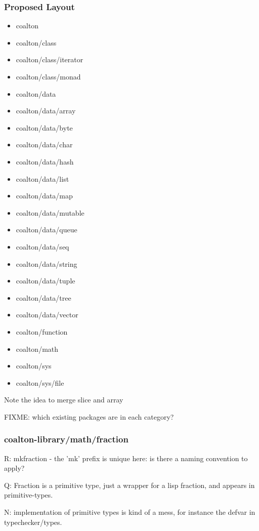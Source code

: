 \documentclass[12pt]{article}
\begin{document}
\subsubsection{Proposed Layout}

\begin{itemize}
\item coalton
\item coalton/class
\item coalton/class/iterator
\item coalton/class/monad
\item coalton/data
\item coalton/data/array
\item coalton/data/byte
\item coalton/data/char
\item coalton/data/hash
\item coalton/data/list
\item coalton/data/map
\item coalton/data/mutable
\item coalton/data/queue
\item coalton/data/seq
\item coalton/data/string
\item coalton/data/tuple
\item coalton/data/tree
\item coalton/data/vector
\item coalton/function
\item coalton/math
\item coalton/sys
\item coalton/sys/file
\end {itemize}

Note the idea to merge slice and array

FIXME: which existing packages are in each category?

\subsubsection{coalton-library/math/fraction}

R: mkfraction - the 'mk' prefix is unique here: is there a naming convention to apply?

Q: Fraction is a primitive type, just a wrapper for a lisp fraction, and appears in primitive-types.

N: implementation of primitive types is kind of a mess, for instance
the defvar in typechecker/types.
\end{document}
